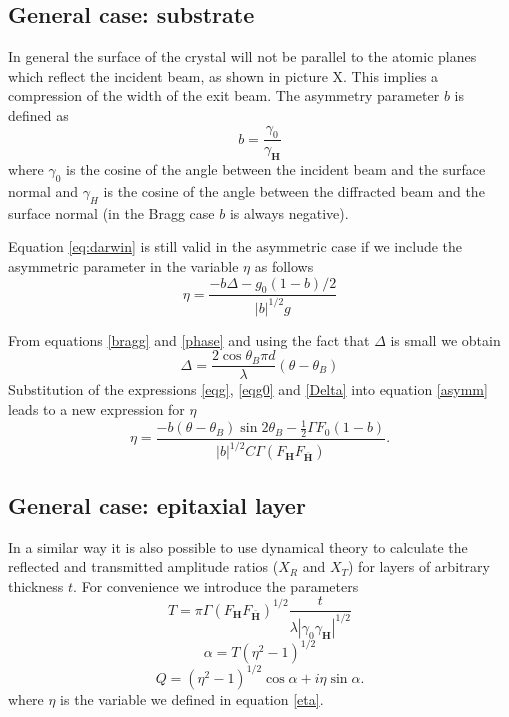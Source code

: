 \documentclass[12pt,oneside,notitlepage,abstracton,a4paper]{scrartcl}
\begin{document}

\subsection{General case: substrate}
In general the surface of the crystal will not be parallel to the atomic planes which reflect the incident beam, as shown in picture X. This implies a compression of the width of the exit beam. The asymmetry parameter $b$ is defined as
\begin{equation}\label{bdef}
 b=\frac{\gamma_0}{\gamma_\mathbf{H}}
\end{equation}
where $\gamma_0$ is the cosine of the angle between the incident beam and the surface normal and $\gamma_H$ is the cosine of the angle between the diffracted beam and the surface normal (in the Bragg case $b$ is always negative).

Equation \ref{eq:darwin} is still valid in the asymmetric case if we include the asymmetric parameter in the variable $\eta$ as follows
\begin{equation}\label{asymm}
 \eta=\frac{-b\Delta-g_0(1-b)/2}{|b|^{1/2}g}
\end{equation}

From equations \ref{bragg} and \ref{phase} and using the fact that $\Delta$ is small we obtain
\begin{equation}\label{Delta}
 \Delta=\frac{2\cos{\theta_B} \pi d}{\lambda}(\theta-\theta_B)
\end{equation}
Substitution of the expressions \ref{eqg}, \ref{eqg0} and \ref{Delta} into equation \ref{asymm} leads to a new expression for $\eta$
\begin{equation}\label{eta}
 \eta=\frac{-b(\theta-\theta_B) \sin{2 \theta_B}-\frac{1}{2}\Gamma F_0(1-b)}{|b|^{1/2}C\Gamma(F_\mathbf{H}F_\mathbf{\bar{H}})}.
\end{equation}


\subsection{General case: epitaxial layer}
In a similar way it is also possible to use dynamical theory to calculate the reflected and transmitted amplitude ratios ($X_R$ and $X_T$) for layers of arbitrary thickness $t$. For convenience we introduce the parameters
\begin{equation}
 T=\pi \Gamma (F_\mathbf{H}F_\mathbf{\bar{H}})^{1/2}\frac{t}{\lambda |\gamma_0 \gamma_\mathbf{H}|^{1/2}}
 \end{equation}
\begin{equation}
 \alpha=T(\eta^2-1)^{1/2}
 \end{equation}
\begin{equation}
 Q=(\eta^2-1)^{1/2}\cos{\alpha} +i\eta \sin{\alpha}.
\end{equation}
where $\eta$ is the variable we defined in equation \ref{eta}.
\end{document}
